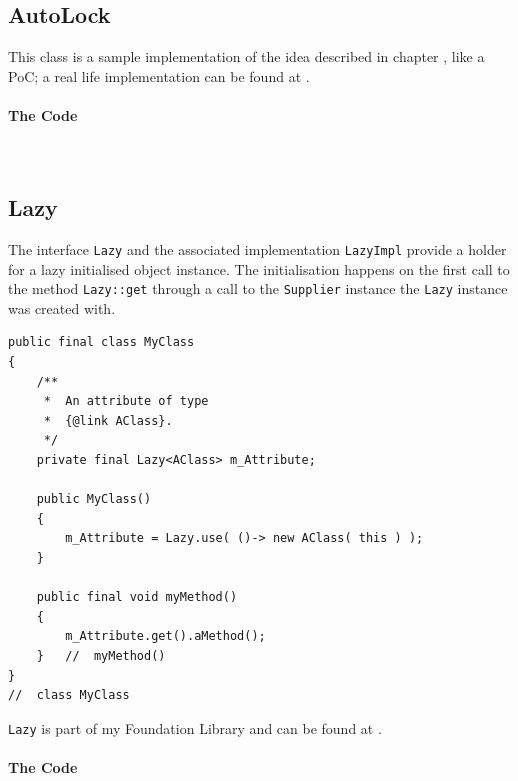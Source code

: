 \subsection{AutoLock}\label{sec:AutoLock}
This class is a sample implementation of the idea described in chapter , like a PoC; a real life implementation can be found at \autocite{TQUADRAT_ORG_FOUNDATION_AUTOLOCK}.


\paragraph{The Code} \




\subsection{Lazy}\label{sec:Lazy}
The interface \lstinline|Lazy| and the associated implementation \lstinline|LazyImpl| provide a holder for a lazy initialised object instance. The initialisation happens on the first call to the method \lstinline|Lazy::get| through a call to the \lstinline|Supplier| instance the \lstinline|Lazy| instance was created with.

\begin{lstlisting}
public final class MyClass
{
    /**
     *  An attribute of type
     *  {@link AClass}.
     */
    private final Lazy<AClass> m_Attribute;
    
    public MyClass()
    {
        m_Attribute = Lazy.use( ()-> new AClass( this ) );
    }
    
    public final void myMethod()
    {
        m_Attribute.get().aMethod();
    }   //  myMethod()
}
//  class MyClass
\end{lstlisting}

\lstinline|Lazy| is part of my Foundation Library and can be found at \autocite{TQUADRAT_ORG_FOUNDATION_LAZY}.


\paragraph{The Code}\


